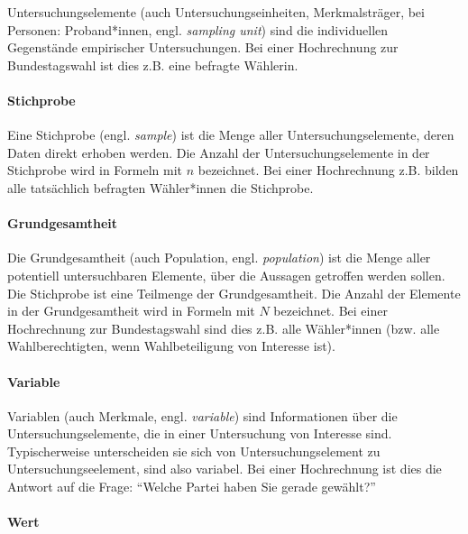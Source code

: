 \documentclass[
  ngerman,
]{article}
\begin{document}
Untersuchungselemente (auch Untersuchungseinheiten, Merkmalsträger, bei Personen: Proband*innen, engl. \emph{sampling unit}) sind die individuellen Gegenstände empirischer Untersuchungen. Bei einer Hochrechnung zur Bundestagswahl ist dies z.B. eine befragte Wählerin.

\hypertarget{stichprobe}{%
\paragraph{Stichprobe}\label{stichprobe}}

Eine Stichprobe (engl. \emph{sample}) ist die Menge aller Untersuchungselemente, deren Daten direkt erhoben werden. Die Anzahl der Untersuchungselemente in der Stichprobe wird in Formeln mit \(n\) bezeichnet. Bei einer Hochrechnung z.B. bilden alle tatsächlich befragten Wähler*innen die Stichprobe.

\hypertarget{grundgesamtheit}{%
\paragraph{Grundgesamtheit}\label{grundgesamtheit}}

Die Grundgesamtheit (auch Population, engl. \emph{population}) ist die Menge aller potentiell untersuchbaren Elemente, über die Aussagen getroffen werden sollen. Die Stichprobe ist eine Teilmenge der Grundgesamtheit. Die Anzahl der Elemente in der Grundgesamtheit wird in Formeln mit \(N\) bezeichnet. Bei einer Hochrechnung zur Bundestagswahl sind dies z.B. alle Wähler*innen (bzw. alle Wahlberechtigten, wenn Wahlbeteiligung von Interesse ist).

\hypertarget{variable}{%
\paragraph{Variable}\label{variable}}

Variablen (auch Merkmale, engl. \emph{variable}) sind Informationen über die Untersuchungselemente, die in einer Untersuchung von Interesse sind. Typischerweise unterscheiden sie sich von Untersuchungselement zu Untersuchungseelement, sind also variabel. Bei einer Hochrechnung ist dies die Antwort auf die Frage: ``Welche Partei haben Sie gerade gewählt?''

\hypertarget{wert}{%
\paragraph{Wert}\label{wert}}
\end{document}
